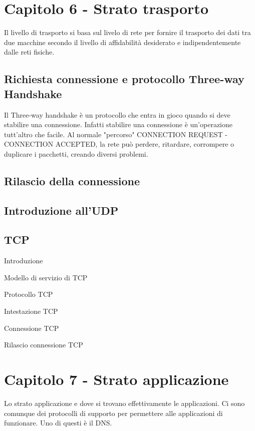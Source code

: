 \newpage
\section{Capitolo 6 - Strato trasporto}
Il livello di trasporto si basa sul livelo di rete per fornire il trasporto dei dati tra due macchine secondo il livello di affidabilità desiderato e indipendentemente dalle reti fisiche. 

\subsection{Richiesta connessione e protocollo Three-way Handshake}

Il Three-way handshake è un protocollo che entra in gioco quando si deve stabilire una connessione.
Infatti stabilire una connessione è un'operazione tutt'altro che facile.
Al normale "percorso" CONNECTION REQUEST - CONNECTION ACCEPTED, la rete può perdere, ritardare, corrompere o duplicare i pacchetti, creando diversi problemi.



\subsection{Rilascio della connessione}

\subsection{Introduzione all'UDP}

\subsection{TCP}

Introduzione

Modello di servizio di TCP

Protocollo TCP

Intestazione TCP

Connessione TCP

Rilascio connessione TCP




\newpage
\section{Capitolo 7 - Strato applicazione} %

Lo strato applicazione e dove si trovano effettivamente le applicazioni.
Ci sono comunque dei protocolli di supporto per permettere alle applicazioni di funzionare.
Uno di questi è il DNS.

